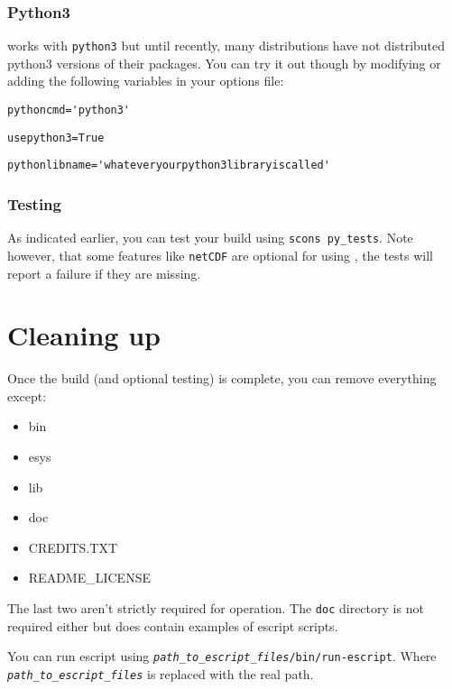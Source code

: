 \subsubsection{Python3}
\escript works with \texttt{python3} but until recently, many distributions have not distributed python3 versions of their packages.
You can try it out though by modifying or adding the following variables in your options file:

\begin{verbatim}
pythoncmd='python3'
\end{verbatim}

\begin{verbatim}
usepython3=True
\end{verbatim}

\begin{verbatim}
pythonlibname='whateveryourpython3libraryiscalled'
\end{verbatim}




\subsubsection{Testing}
As indicated earlier, you can test your build using \texttt{scons py_tests}.
Note however, that some features like \texttt{netCDF} are optional for using \escript, the tests will report a failure if
they are missing.

\section{Cleaning up}
\label{sec:cleanup}

Once the build (and optional testing) is complete, you can remove everything except:
\begin{itemize}
 \item bin
 \item esys
 \item lib
 \item doc
 \item CREDITS.TXT
 \item README_LICENSE
\end{itemize}
The last two aren't strictly required for operation.
The \texttt{doc} directory is not required either but does contain examples of escript scripts.

You can run escript using \texttt{\textit{path_to_escript_files}/bin/run-escript}.
Where \texttt{\textit{path_to_escript_files}} is replaced with the real path.

